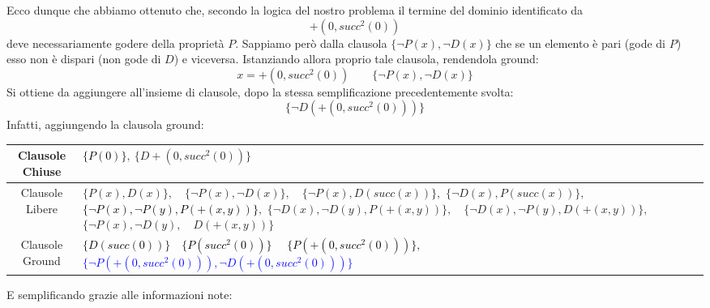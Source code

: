 \documentclass[a4paper,10pt]{article}
\begin{document}
Ecco dunque che abbiamo ottenuto che, secondo la logica del nostro problema il termine del dominio identificato da $$+(0, succ^2(0))$$
deve necessariamente godere della proprietà $P$. Sappiamo però dalla clausola $\{\lnot P(x),\lnot D(x)\}$ che se un elemento è pari (gode di $P$) esso non è dispari (non gode di $D$) e viceversa. Istanziando allora proprio tale clausola, rendendola ground:
$$x=+(0, succ^2(0))\quad\quad \{\lnot P(x),\lnot D(x)\}$$
Si ottiene da aggiungere all'insieme di clausole, dopo la stessa semplificazione precedentemente svolta:
$$\{\lnot D(+(0, succ^2(0)))\}$$
Infatti, aggiungendo la clausola ground:
\begin{table}[h]
    \centering
    \small 
    \renewcommand{\arraystretch}{1.5} 
    
    \begin{tabularx}{\textwidth}{|c|>{\centering\arraybackslash}X|}
        \hline
        Clausole Chiuse & \textcolor{black}{$\{P(0)\}$}$, \ \{D+(0,succ^2(0))\}$ \\
        \hline
        Clausole Libere & 
            $\{P(x), D(x)\},\quad \{\lnot P(x), \lnot D(x)\},\quad \{\lnot P(x), D(succ(x))\},$\newline
            $\{\lnot D(x), P(succ(x))\},\quad $\textcolor{black}{$\{\lnot P(x), \lnot P(y), P(+(x, y))\}$}$,$\newline
            $\{\lnot D(x), \lnot D(y), P(+(x, y))\},\quad \{\lnot D(x), \lnot P(y), D(+(x, y))\},$\newline
            $\{\lnot P(x), \lnot D(y),\quad D(+(x, y))\}$ 
            \\
        \hline
        Clausole Ground & \textcolor{black}{$\{D(succ(0))\}\quad$}\textcolor{black}{$\{P(succ^2(0))\}\quad$}
        \textcolor{black}{$\{P(+(0, succ^2(0)))\},\quad$}
        \textcolor{blue}{$\{\lnot P(+(0, succ^2(0))),\lnot D(+(0, succ^2(0)))\}$}
        \\
        \hline
    \end{tabularx}
\end{table}

E semplificando grazie alle informazioni note:
\end{document}
